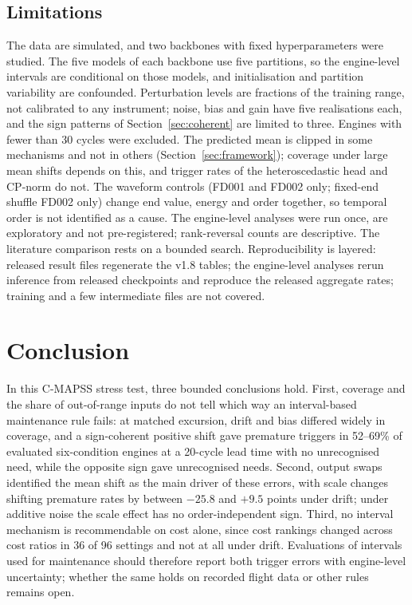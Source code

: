 \documentclass[11pt,a4paper]{article}
\newcommand{\JDriftPremRange}{52--69}
\newcommand{\JRevTotal}{36}
\newcommand{\JRevGroups}{96}
\newcommand{\JSigExtMaxPt}{$+9.5$}
\newcommand{\JSigExtMinPt}{$-25.8$}
\begin{document}
\subsection{Limitations}
The data are simulated, and two backbones with fixed hyperparameters were studied. The five models of each backbone use five partitions, so the engine-level intervals are conditional on those models, and initialisation and partition variability are confounded. Perturbation levels are fractions of the training range, not calibrated to any instrument; noise, bias and gain have five realisations each, and the sign patterns of Section~\ref{sec:coherent} are limited to three. Engines with fewer than 30 cycles were excluded. The predicted mean is clipped in some mechanisms and not in others (Section~\ref{sec:framework}); coverage under large mean shifts depends on this, and trigger rates of the heteroscedastic head and CP-norm do not. The waveform controls (FD001 and FD002 only; fixed-end shuffle FD002 only) change end value, energy and order together, so temporal order is not identified as a cause. The engine-level analyses were run once, are exploratory and not pre-registered; rank-reversal counts are descriptive. The literature comparison rests on a bounded search. Reproducibility is layered: released result files regenerate the v1.8 tables; the engine-level analyses rerun inference from released checkpoints and reproduce the released aggregate rates; training and a few intermediate files are not covered.

\section{Conclusion}
In this C-MAPSS stress test, three bounded conclusions hold. First, coverage and the share of out-of-range inputs do not tell which way an interval-based maintenance rule fails: at matched excursion, drift and bias differed widely in coverage, and a sign-coherent positive shift gave premature triggers in \JDriftPremRange\% of evaluated six-condition engines at a 20-cycle lead time with no unrecognised need, while the opposite sign gave unrecognised needs. Second, output swaps identified the mean shift as the main driver of these errors, with scale changes shifting premature rates by between \JSigExtMinPt{} and \JSigExtMaxPt{} points under drift; under additive noise the scale effect has no order-independent sign. Third, no interval mechanism is recommendable on cost alone, since cost rankings changed across cost ratios in \JRevTotal{} of \JRevGroups{} settings and not at all under drift. Evaluations of intervals used for maintenance should therefore report both trigger errors with engine-level uncertainty; whether the same holds on recorded flight data or other rules remains open.
\end{document}
